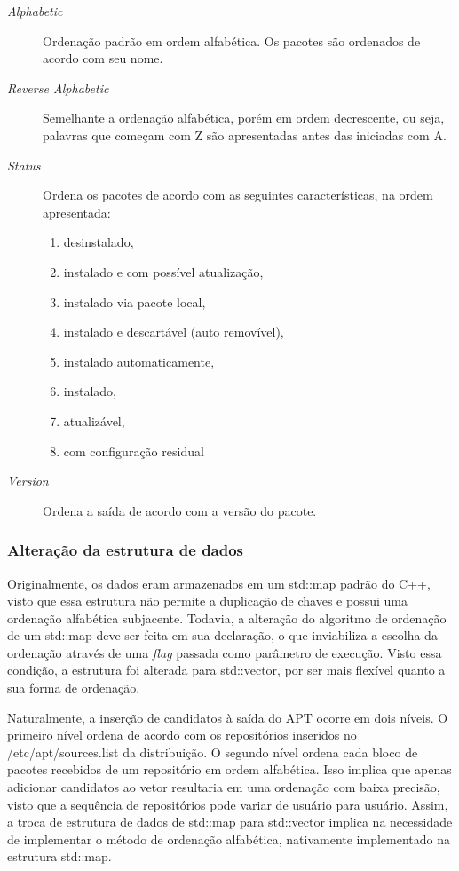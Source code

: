 \begin{description}
	\item [\textit{Alphabetic}] Ordenação padrão em ordem alfabética. Os pacotes são ordenados de acordo com seu nome.
	\item [\textit{Reverse Alphabetic}] Semelhante a ordenação alfabética, porém em ordem decrescente, ou seja, palavras que começam com {\code Z} são apresentadas antes das iniciadas com {\code A}.
	\item [\textit{Status}] Ordena os pacotes de acordo com as seguintes características, na ordem apresentada:
	\begin{enumerate}
		\item desinstalado,
		\item instalado e com possível atualização,
		\item instalado via pacote local,
		\item instalado e descartável (auto removível),
		\item instalado automaticamente,
		\item instalado,
		\item atualizável,
		\item com configuração residual
	\end{enumerate}
	\item [\textit{Version}] Ordena a saída de acordo com a versão do pacote.
\end{description}

\subsubsection*{Alteração da estrutura de dados} %
\label{sub:altera_o_da_estrutuda_de_dados}

Originalmente, os dados eram armazenados em um {\code std::map} padrão do {\code C++}, visto que essa estrutura não permite a duplicação de chaves e possui uma ordenação alfabética subjacente. Todavia, a alteração do algoritmo de ordenação de um {\code std::map} deve ser feita em sua declaração, o que inviabiliza a escolha da ordenação através de uma \textit{flag} passada como parâmetro de execução. Visto essa condição, a estrutura foi alterada para {\code std::vector}, por ser mais flexível quanto a sua forma de ordenação.

Naturalmente, a inserção de candidatos à saída do {\code APT} ocorre  em dois níveis. O primeiro nível ordena de acordo com os repositórios inseridos no {\code /etc/apt/sources.list} da distribuição. O segundo nível ordena cada bloco de pacotes recebidos de um repositório em ordem alfabética. Isso implica que apenas adicionar candidatos ao vetor resultaria em uma ordenação com baixa precisão, visto que a sequência de repositórios pode variar de usuário para usuário. Assim, a  troca de estrutura de dados de {\code std::map} para {\code std::vector} implica na necessidade de implementar o método de ordenação alfabética, nativamente implementado na estrutura {\code std::map}.

